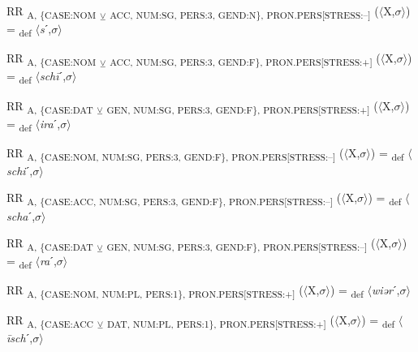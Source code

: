 {\begin{exe}
 RR \textsubscript{A, \{CASE:NOM} \textsubscript{${\veebar}$}\textsubscript{ ACC, NUM:SG, PERS:3, GEND:N\}, PRON.PERS[STRESS:–]} ($\langle$X,$\sigma $$\rangle$) = \textsubscript{def} $\langle$\textit{s}ˊ,$\sigma $$\rangle$
\end{exe}

\begin{exe}
 RR \textsubscript{A, \{CASE:NOM} \textsubscript{${\veebar}$}\textsubscript{ ACC, NUM:SG, PERS:3, GEND:F\}, PRON.PERS[STRESS:+]} ($\langle$X,$\sigma $$\rangle$) = \textsubscript{def} $\langle$\textit{sch\=i}ˊ,$\sigma $$\rangle$
\end{exe}

\begin{exe}
 RR \textsubscript{A, \{CASE:DAT} \textsubscript{${\veebar}$}\textsubscript{ GEN, NUM:SG, PERS:3, GEND:F\}, PRON.PERS[STRESS:+]} ($\langle$X,$\sigma $$\rangle$) = \textsubscript{def} $\langle$\textit{ira}ˊ,$\sigma $$\rangle$
\end{exe}

\begin{exe}
 RR \textsubscript{A, \{CASE:NOM, NUM:SG, PERS:3, GEND:F\}, PRON.PERS[STRESS:–]} ($\langle$X,$\sigma $$\rangle$) = \textsubscript{def} $\langle$\textit{schi}ˊ,$\sigma $$\rangle$
\end{exe}

\begin{exe}
 RR \textsubscript{A, \{CASE:ACC, NUM:SG, PERS:3, GEND:F\}, PRON.PERS[STRESS:–]} ($\langle$X,$\sigma $$\rangle$) = \textsubscript{def} $\langle$\textit{scha}ˊ,$\sigma $$\rangle$
\end{exe}

\begin{exe}
 RR \textsubscript{A, \{CASE:DAT} \textsubscript{${\veebar}$}\textsubscript{ GEN, NUM:SG, PERS:3, GEND:F\}, PRON.PERS[STRESS:–]} ($\langle$X,$\sigma $$\rangle$) = \textsubscript{def} $\langle$\textit{ra}ˊ,$\sigma $$\rangle$
\end{exe}

\begin{exe}
 RR \textsubscript{A, \{CASE:NOM, NUM:PL, PERS:1\}, PRON.PERS[STRESS:+]} ($\langle$X,$\sigma $$\rangle$) = \textsubscript{def} $\langle$\textit{wiər}ˊ,$\sigma $$\rangle$
\end{exe}

\begin{exe}
 RR \textsubscript{A, \{CASE:ACC} \textsubscript{${\veebar}$}\textsubscript{ DAT, NUM:PL, PERS:1\}, PRON.PERS[STRESS:+]} ($\langle$X,$\sigma $$\rangle$) = \textsubscript{def} $\langle$\textit{\=isch}ˊ,$\sigma $$\rangle$
\end{exe}

}
